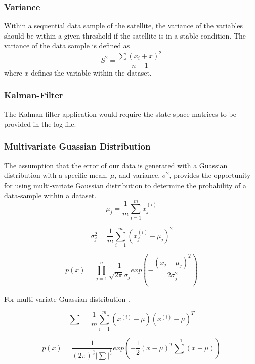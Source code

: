 \cite{fukumizu2007statistical}

\subsubsection{Variance}
Within a sequential data sample of the satellite, the variance of the variables should be within a given threshold if the satellite is in a stable condition. The variance of the data sample is defined as 
\begin{equation}
S^2 = \frac{\sum(x_i + \bar{x})^2}{n-1}
\end{equation}
where $x$ defines the variable within the dataset.

\subsubsection{Kalman-Filter}
The Kalman-filter application would require the state-space matrices to be provided in the log file.

\subsubsection{Multivariate Guassian Distribution}
The assumption that the error of our data is generated with a Guassian distribution with a specific mean, $\mu$, and variance, $\sigma^2$, provides the opportunity for using multi-variate Gaussian distribution to determine the probability of a data-sample within a dataset. 
\begin{equation}
\label{mean}
\mu_j = \frac{1}{m} \sum_{i=1}^{m}x_j^{(i)}
\end{equation}

\begin{equation}
\label{variance}
\sigma_j^2 = \frac{1}{m} \sum_{i=1}^{m}(x_j^{(i)} - \mu_j)^2
\end{equation}

\begin{equation}
\label{guassian distribution}
p(x) = \prod_{j=1}^{n} \frac{1}{\sqrt{2\pi}\sigma_j}exp(-\frac{(x_j-\mu_j)^2}{2\sigma_j^2})
\end{equation}

For multi-variate Guassian distribution \cite{do2008multivariate}.

\begin{equation}
\label{sum}
\sum = \frac{1}{m}\sum_{i=1}^{m}(x^{(i)}-\mu)(x^{(i)}-\mu)^T
\end{equation}

\begin{equation}
\label{multi-variate guassian distribution}
p(x) = \frac{1}{(2\pi)^{\frac{n}{2}}{\lvert \sum \rvert}^\frac{1}{2}} exp(-\frac{1}{2}(x-\mu)^T{\sum}^{-1}(x-\mu))
\end{equation}

